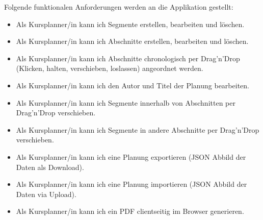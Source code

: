 Folgende funktionalen Anforderungen werden an die Applikation gestellt:
\begin{itemize}
  \item Als Kursplanner/in kann ich Segmente erstellen, bearbeiten und löschen.
  \item Als Kursplanner/in kann ich Abschnitte erstellen, bearbeiten und löschen.
  \item Als Kursplanner/in kann ich Abschnitte chronologisch per Drag'n'Drop (Klicken, halten, verschieben, loslassen) angeordnet werden.
  \item Als Kursplanner/in kann ich den Autor und Titel der Planung bearbeiten.
  \item Als Kursplanner/in kann ich Segmente innerhalb von Abschnitten per Drag'n'Drop verschieben.
  \item Als Kursplanner/in kann ich Segmente in andere Abschnitte per Drag'n'Drop verschieben.
  \item Als Kursplanner/in kann ich eine Planung exportieren (JSON Abbild der Daten als Download).
  \item Als Kursplanner/in kann ich eine Planung importieren (JSON Abbild der Daten via Upload).
  \item Als Kursplanner/in kann ich ein PDF clientseitig im Browser generieren.
\end{itemize}

